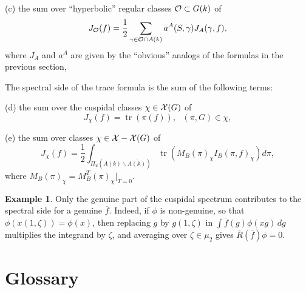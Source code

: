 \documentclass[12pt,letterpaper,openany]{book}
\theoremstyle{plain}
\theoremstyle{definition}
\newtheorem{example}[theorem]{Example}
\theoremstyle{remark}
\theoremstyle{remark}
\newcommand{\tr}{\operatorname{tr}}
\begin{document}
(c) the sum over ``hyperbolic'' regular classes
${\cal{O}}\subset G(k)$
of
\begin{equation}
J_{\cal{O}}(f)=
{\frac{1}{2}}\sum_{\gamma\in {\cal O}\cap A(k)}
a^A(S,\gamma)J_A(\gamma,f),
\end{equation}
where $J_A$ and $a^A$
are given by the ``obvious'' analogs of the formulas
in the previous section,

The spectral side of the trace formula is the sum of the following terms:

(d) the sum over the cuspidal classes $\chi\in {\cal{X}}(G)$ of
\begin{equation}
J_\chi(f)=
\tr(\pi(f)),\ \ \ (\pi,G)\in\chi,
\end{equation}

(e) the sum over classes $\chi\in {\cal{X}}-{\cal{X}}(G)$ of
\begin{equation}
J_\chi(f)=
{\frac{1}{2}}\int_{\Pi_u(A(k)\backslash\overline{A({\mathbb{A}})})}
\tr(M_B(\pi)_\chi I_B(\pi,f)_\chi)d\pi,
\end{equation}
where $M_B(\pi)_\chi =M_B^T(\pi)_\chi|_{T=0}$.



\begin{example}
Only the genuine part of the cuspidal spectrum contributes to the
spectral side for a genuine $\overline f$. Indeed, if $\phi$ is
non-genuine, so that $\phi(x(1,\zeta))=\phi(x)$, then replacing $g$ by
$g(1,\zeta)$ in $\int\overline f(g)\phi(xg)\,dg$ multiplies the integrand by
$\zeta$, and averaging over $\zeta\in\mu_2$ gives
$\overline R(\overline f)\phi=0$.
\end{example}


\chapter*{Glossary}
\end{document}
